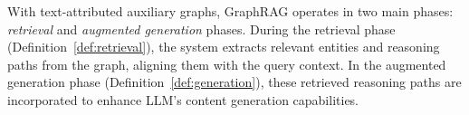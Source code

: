     

With text-attributed auxiliary graphs, GraphRAG operates in two main phases: \textit{retrieval} and \textit{augmented generation} phases. During the retrieval phase (Definition~\ref{def:retrieval}), the system extracts relevant entities and reasoning paths from the graph, aligning them with the query context.
In the augmented generation phase (Definition~\ref{def:generation}), these retrieved reasoning paths are incorporated to enhance LLM's content generation capabilities.



